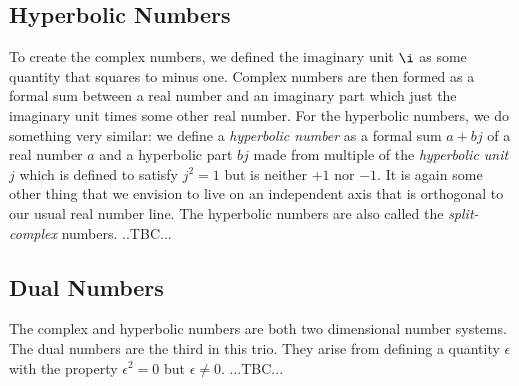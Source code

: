 




\subsection{Hyperbolic Numbers}
To create the complex numbers, we defined the imaginary unit $\i$ as some quantity that squares to minus one. Complex numbers are then formed as a formal sum between a real number and an imaginary part which just the imaginary unit times some other real number. For the hyperbolic numbers, we do something very similar: we define a \emph{hyperbolic number} as a formal sum $a + b j$ of a real number $a$ and a hyperbolic part $b j$ made from multiple of the \emph{hyperbolic unit} $j$ which is defined to satisfy $j^2 = 1$ but is neither $+1$ nor $-1$. It is again some other thing that we envision to live on an independent axis that is orthogonal to our usual real number line. The hyperbolic numbers are also called the \emph{split-complex} numbers. ..TBC...




\subsection{Dual Numbers}
The complex and hyperbolic numbers are both two dimensional number systems. The dual numbers are the third in this trio. They arise from defining a quantity $\epsilon$ with the property $\epsilon^2 = 0$ but $\epsilon \neq 0$. ...TBC...



